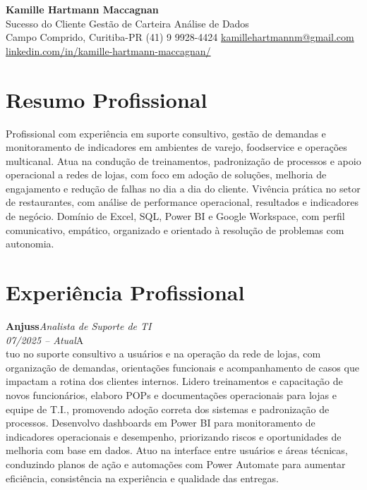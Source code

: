 \documentclass[11pt,a4paper]{article}
\newcommand{\cvrole}[4]{%
  \vspace{4pt}%
  {\bfseries\color{accentcolor}#1}\hfill{\itshape #2}\\[-2pt]%
  {\itshape #3}\hfill #4\\[6pt]%
}
\begin{document}
\begin{center}
  {\fontsize{20}{24}\selectfont\bfseries Kamille Hartmann Maccagnan}\\[8pt]
  {\large Sucesso do Cliente \textbar{} Gestão de Carteira \textbar{} Análise de Dados}\\[10pt]
  Campo Comprido, Curitiba-PR \enspace\textbullet\enspace (41) 9 9928-4424 \enspace\textbullet\enspace
  \href{mailto:kamillehartmannm@gmail.com}{kamillehartmannm@gmail.com}\\[3pt]
  \href{https://linkedin.com/in/kamille-hartmann-maccagnan/}{linkedin.com/in/kamille-hartmann-maccagnan/}
\end{center}

\vspace{6pt}

\section{Resumo Profissional}

Profissional com experiência em suporte consultivo, gestão de demandas e monitoramento de indicadores em ambientes de varejo, foodservice e operações multicanal. Atua na condução de treinamentos, padronização de processos e apoio operacional a redes de lojas, com foco em adoção de soluções, melhoria de engajamento e redução de falhas no dia a dia do cliente. Vivência prática no setor de restaurantes, com análise de performance operacional, resultados e indicadores de negócio. Domínio de Excel, SQL, Power BI e Google Workspace, com perfil comunicativo, empático, organizado e orientado à resolução de problemas com autonomia.

\section{Experiência Profissional}

\cvrole{Anjuss}{Analista de Suporte de TI}{07/2025 -- Atual}

Atuo no suporte consultivo a usuários e na operação da rede de lojas, com organização de demandas, orientações funcionais e acompanhamento de casos que impactam a rotina dos clientes internos. Lidero treinamentos e capacitação de novos funcionários, elaboro POPs e documentações operacionais para lojas e equipe de T.I., promovendo adoção correta dos sistemas e padronização de processos. Desenvolvo dashboards em Power BI para monitoramento de indicadores operacionais e desempenho, priorizando riscos e oportunidades de melhoria com base em dados. Atuo na interface entre usuários e áreas técnicas, conduzindo planos de ação e automações com Power Automate para aumentar eficiência, consistência na experiência e qualidade das entregas.
\end{document}

